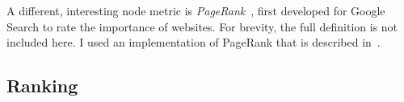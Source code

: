A different, interesting node metric is \textsl{PageRank}~\cite{BrinAnatomyLargescaleHypertextual1998}, first developed for Google Search to rate the importance of websites.
For brevity, the full definition is not included here.
I used an implementation of PageRank that is described in~\cite{ilprints422}.


%
%
%

%
%
%
%

\subsection{Ranking}


